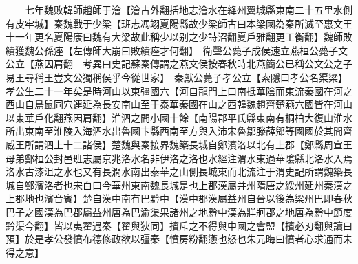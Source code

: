 　　七年魏敗韓師趙師于澮【澮古外翻括地志澮水在絳州翼城縣東南二十五里水側有皮牢城】秦魏戰于少梁【班志馮翊夏陽縣故少梁師古曰本梁國為秦所滅至惠文王十一年更名夏陽康曰魏有大梁故此稱少以别之少詩沼翻夏戶雅翻更工衡翻】魏師敗績獲魏公孫痤【左傳師大崩曰敗績痤才何翻】　衛聲公薨子成侯速立燕桓公薨子文公立【燕因肩翻　考異曰史記蘇秦傳謂之燕文侯按春秋時北燕簡公已稱公文公之子易王尋稱王豈文公獨稱侯乎今從世家】　秦獻公薨子孝公立【索隱曰孝公名渠梁】孝公生二十一年矣是時河山以東彊國六【河自龍門上口南抵華陰而東流秦國在河之西山自鳥鼠同穴連延為長安南山至于泰華秦國在山之西韓魏趙齊楚燕六國皆在河山以東華戶化翻燕因肩翻】淮泗之間小國十餘【南陽郡平氏縣東南有桐柏大復山淮水所出東南至淮陵入海泗水出魯國卞縣西南至方與入沛宋魯鄒滕薛郳等國國於其間齊威王所謂泗上十二諸侯】楚魏與秦接界魏築長城自鄭濱洛以北有上郡【鄭縣周宣王母弟鄭桓公封邑班志屬京兆洛水名非伊洛之洛也水經注渭水東過華隂縣北洛水入焉洛水古漆沮之水也又有長澗水南出泰華之山側長城東而北流注于渭史記所謂魏築長城自鄭濱洛者也宋白曰今華州東南魏長城是也上郡漢屬并州隋唐之綏州延州秦漢之上郡地也濱音賓】楚自漢中南有巴黔中【漢中郡漢屬益州自晉以後為梁州巴即春秋巴子之國漢為巴郡屬益州唐為巴渝渠果諸州之地黔中漢為牂牁郡之地唐為黔中節度黔渠今翻】皆以夷翟遇秦【翟與狄同】擯斥之不得與中國之會盟【擯必刃翻與讀曰預】於是孝公發憤布德修政欲以彊秦【憤房粉翻懣也怒也朱元晦曰憤者心求通而未得之意】

